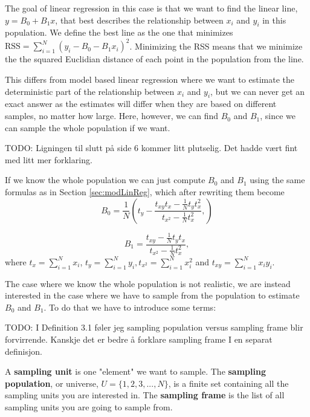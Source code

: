 \documentclass{article}
\begin{document}
The goal of linear regression in this case is that we want to find the linear
line, \(y = B_0 + B_1x\), that best describes the relationship between \(x_i\)
and \(y_i\) in this population. We define the best line as the one
that minimizes \(\mathrm{RSS} = \sum_{i = 1}^N (y_i - B_0 - B_1 x_i)^2\).
Minimizing the RSS means that we minimize the the squared Euclidian distance of each point
in the population from the line.

This differs from model based linear regression where we want to estimate the
deterministic part of the relationship between \(x_i\) and \(y_i\), but we can
never get an exact answer as the estimates will differ when they are based on
different samples, no matter how large. Here, however, we can find \(B_0\) and
\(B_1\), since we can sample the whole population if we want.

TODO:  Ligningen til slutt på side 6 kommer litt plutselig. Det hadde vært fint med litt mer forklaring.


If we know the whole population we can just compute \(B_0\) and \(B_1\) using the same formulas
as in Section \ref{sec:modLinReg}, which after rewriting them become
\begin{equation*}
 B_0 = \frac{1}{N} \left( t_y - \frac{t_{xy} t_x - \frac{1}{N} t_y t_x^2}
   {t_{x^2} - \frac{1}{N} t_x^2},
  \right)
\end{equation*}

\begin{equation*}
 B_1 = \frac{t_{xy} - \frac{1}{N} t_y t_x}
   {t_{x^2} - \frac{1}{N} t_x^2},
\end{equation*}
where \(t_x = \sum_{i = 1}^N x_i\), \(t_y = \sum_{i = 1}^N y_i, t_{x^2} =
\sum_{i = 1}^N x_i^2\) and \(t_{xy} =
\sum_{i = 1}^N x_i y_i\).

The case where we know the whole population is not realistic, we are instead interested in the case where we have to sample from the
population to estimate \(B_0\) and \(B_1\). To do that we have to introduce some terms:

TODO: I Definition 3.1 føler jeg sampling population versus sampling frame blir forvirrende. Kanskje det er bedre å forklare sampling frame I en separat definisjon.


\begin{definition} \label{def:sampUnitPopFrame}
 A \textbf{sampling unit} is one "element" we want to sample.
 The \textbf{sampling population}, or universe, \(U = \{1, 2, 3, ..., N\}\), is a
 finite set containing all the sampling units you are interested in. 
 The \textbf{sampling frame} is the list of all sampling units you are going to sample from. 
\end{definition}
\end{document}
